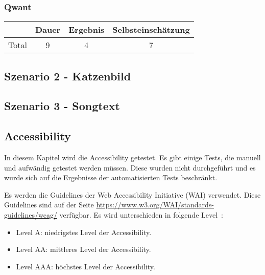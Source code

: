 \subsubsection*{Qwant}
\begin{tabular}{|c|c|c|c|}
    \hline
    & Dauer & Ergebnis & Selbsteinschätzung\\
    \hline
    Total & 9 & 4 & 7\\
    \hline
\end{tabular}

\subsection{Szenario 2 - Katzenbild}\label{subsec:szenario2}
\subsection{Szenario 3 - Songtext}\label{subsec:szenario3}

\subsection{Accessibility}\label{subsec:accessibility}
In diesem Kapitel wird die Accessibility getestet.
Es gibt einige Tests, die manuell und aufwändig getestet werden müssen.
Diese wurden nicht durchgeführt und es wurde sich auf die Ergebnisse der automatisierten Tests beschränkt.

Es werden die Guidelines der Web Accessibility Initiative (WAI) verwendet.
Diese Guidelines sind auf der Seite \url{https://www.w3.org/WAI/standards-guidelines/wcag/} verfügbar.\newline
Es wird unterschieden in folgende Level~\cite{WCAG21}:
\begin{itemize}
\item Level A: niedrigstes Level der Accessibility.
\item Level AA: mittleres Level der Accessibility.
\item Level AAA: höchstes Level der Accessibility.
\end{itemize}

